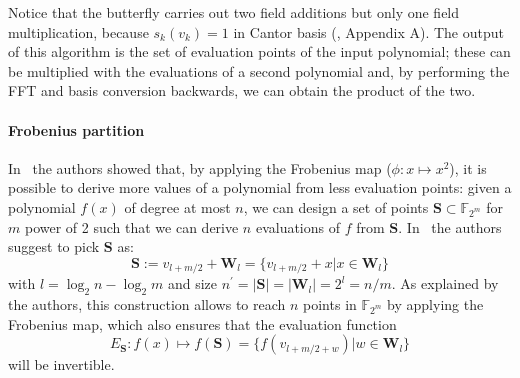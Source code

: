 \documentclass[11pt,a4paper,twocolumn]{article}
\theoremstyle{definition}
\begin{document}
\begin{algorithm2e}
    \caption{Lin-Chung-Han FFT}
    \label{alg:fft}

\end{algorithm2e}
Notice that the butterfly carries out two field additions but only one field multiplication,
because $s_k(v_k)=1$ in Cantor basis (\cite{DBLP:journals/corr/abs-1708-09746}, Appendix A).
The output of this algorithm is the set of evaluation points of the input polynomial; these can be multiplied
with the evaluations of a second polynomial and, by performing the FFT and basis conversion backwards, we can
obtain the product of the two.

\paragraph{Frobenius partition}
In~\cite{DBLP:conf/issac/HoevenL17} the authors showed that, by applying the Frobenius map ($\phi: x \mapsto x^2$),
it is possible to derive more values of a polynomial from less evaluation points: 
given a polynomial $f(x)$ of degree at most $n$, we can design a set of points
$\mathbf{S} \subset \mathds{F}_{2^m}$ for $m$ power of 2 such that we can derive $n$ evaluations
of $f$ from $\mathbf{S}$. In~\cite{DBLP:conf/issac/LiCKCY18} the authors suggest to pick $\mathbf{S}$ as:
\begin{equation}
    \mathbf{S} := v_{l+m/2}+\mathbf{W}_l = \{v_{l+m/2}+x | x \in \mathbf{W}_l\}
    \label{eq:frobpart}
\end{equation}
with $l = \log_2 n - \log_2 m$ and size $n^\prime = |\mathbf{S}| = |\mathbf{W}_l| = 2^l = n/m$.
As explained by the authors, this construction allows to reach $n$ points in $\mathds{F}_{2^m}$ by applying
the Frobenius map, which also ensures that the evaluation function
\begin{equation*} 
    E_\mathbf{S}: f(x) \mapsto f(\mathbf{S}) = \{f(v_{l+m/2+w}) | w \in \mathbf{W}_l\}
\end{equation*}
will be invertible.
\end{document}
